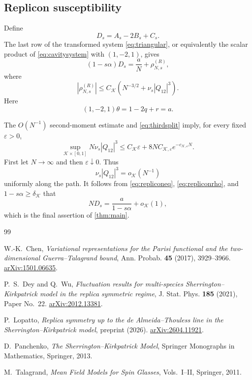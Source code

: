 \documentclass[11pt]{article}
\numberwithin{equation}{section}
\theoremstyle{plain}
\theoremstyle{definition}
\newcommand{\1}{\mathbf 1}
\newcommand{\cK}{\mathcal K}
\begin{document}
\subsection{Replicon susceptibility}\label{subsec:susceptibility}

Define
\[
 D_s=A_s-2B_s+C_s.
\]
The last row of the transformed system \eqref{eq:triangular}, or
equivalently the scalar product of \eqref{eq:cavitysystem} with
$(1,-2,1)$, gives
\begin{equation}
 (1-s\alpha)D_s=\frac aN+\rho^{(R)}_{N,s},
 \label{eq:repliconeq}
\end{equation}
where
\begin{equation}
 |\rho^{(R)}_{N,s}|
 \le C_{\cK}\left(N^{-3/2}+\nu_s|Q_{12}|^3\right).
 \label{eq:repliconrho}
\end{equation}
Here
\[
 (1,-2,1)\theta=1-2q+r=a.
\]

The $O(N^{-1})$ second-moment estimate and
\eqref{eq:thirdsplit} imply, for every fixed $\varepsilon>0$,
\[
 \sup_{\cK\times[0,1]}
 N\nu_s|Q_{12}|^3
 \le C_{\cK}\varepsilon
 +8N C_{\cK,\varepsilon}e^{-c_{\cK,\varepsilon}N}.
\]
First let $N\to\infty$ and then $\varepsilon\downarrow0$.  Thus
\[
 \nu_s|Q_{12}|^3=o_{\cK}(N^{-1})
\]
uniformly along the path.  It follows from
\eqref{eq:repliconeq}, \eqref{eq:repliconrho}, and
$1-s\alpha\ge\delta_{\cK}$ that
\[
 ND_s
 =
 \frac{a}{1-s\alpha}+o_{\cK}(1),
\]
which is the final assertion of \cref{thm:main}.

\begin{thebibliography}{99}

W.-K.~Chen,
\emph{Variational representations for the Parisi functional and the
two-dimensional Guerra--Talagrand bound},
Ann. Probab. \textbf{45} (2017), 3929--3966.
\href{https://arxiv.org/abs/1501.06635}{arXiv:1501.06635}.

P.~S.~Dey and Q.~Wu,
\emph{Fluctuation results for multi-species
Sherrington--Kirkpatrick model in the replica symmetric regime},
J. Stat. Phys. \textbf{185} (2021), Paper No.~22.
\href{https://arxiv.org/abs/2012.13381}{arXiv:2012.13381}.

P.~Lopatto,
\emph{Replica symmetry up to the de Almeida--Thouless line in the
Sherrington--Kirkpatrick model},
preprint (2026).
\href{https://arxiv.org/abs/2604.11921}{arXiv:2604.11921}.

D.~Panchenko,
\emph{The Sherrington--Kirkpatrick Model},
Springer Monographs in Mathematics, Springer, 2013.

M.~Talagrand,
\emph{Mean Field Models for Spin Glasses}, Vols.~I--II,
Springer, 2011.

\end{thebibliography}
\end{document}
